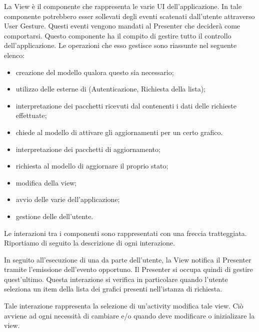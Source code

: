         La View è il componente che rappresenta le varie UI dell'applicazione. In tale componente potrebbero esser sollevati degli eventi scatenati dall'utente attraverso User Gesture. Questi eventi vengono mandati al Presenter che deciderà come comportarsi.
        Questo componente ha il compito di gestire tutto il controllo dell'applicazione. Le operazioni che esso gestisce sono riassunte nel seguente elenco:
        	\begin{itemize}
        		\item creazione del modello qualora questo sia necessario;
        		\item utilizzo delle  esterne di  (Autenticazione, Richiesta della lista);
        		\item interpretazione dei pacchetti ricevuti dal  contenenti i dati delle richieste  effettuate;
                \item chiede al modello di attivare gli aggiornamenti per un certo grafico.
        		\item interpretazione dei pacchetti di aggiornamento;
        		\item richiesta al modello di aggiornare il proprio stato;
        		\item modifica della view;
        		\item avvio delle varie  dell'applicazione;
        		\item gestione delle  dell'utente.
        \end{itemize}
    	Le interazioni tra i componenti sono rappresentati con una freccia tratteggiata.\\
    	Riportiamo di seguito la descrizione di ogni interazione.

        In seguito all'esecuzione di una  da parte dell'utente, la View notifica il Presenter tramite l'emissione dell'evento opportuno. Il Presenter si occupa quindi di gestire quest'ultimo. Questa interazione si verifica in particolare quando l'utente seleziona un item della lista dei grafici presenti nell'istanza di  richiesta.

        Tale interazione rappresenta la selezione di un'activity modifica tale view. Ciò avviene ad ogni necessità di cambiare  e/o quando deve modificare o inizializare la view.

